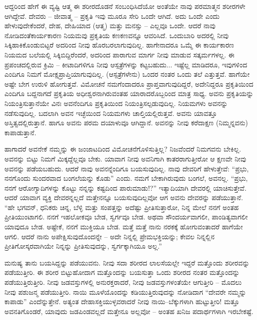 \vskip 4pt

ಆದ್ದರಿಂದ ಹೇಗೆ ಈ ವ್ಯಷ್ಟಿ ಆತ್ಮ ಈ ಶರೀರದೊಡನೆ ಸಂಬಂಧಿಸಿದೆಯೋ ಅಂತೆಯೇ ನಾವು ಪರಮಾತ್ಮನ ಶರೀರಗಳೇ ಆಗಿದ್ದೇವೆ. ದೇವರು – ಜೀವಾತ್ಮ – ಪ್ರಕೃತಿ ಇವು ಮೂರೂ ಸೇರಿ ಒಂದೇ ಆಗಿದೆ. ಅದು ಒಂದೇ ಎಂದು ಹೇಳುವುದೇಕೆಂದರೆ, ದೇಹ, ದೇಹಿಯಾದ (ಆತ್ಮ) ಮತ್ತು ಮನಸ್ಸು – ಎಲ್ಲವೂ ಒಂದೇ. ಆದರೆ ನಾವು ನೋಡಿದಂತೆ\break ಕಾರ್ಯಕಾರಣ ನಿಯಮವು ಪ್ರಕೃತಿಯ ಕಣಕಣವನ್ನೂ ಆವರಿಸಿದೆ. ಒಂದುಬಾರಿ ಅದರಲ್ಲಿ ನೀವು ಸಿಕ್ಕಿಹಾಕಿಕೊಂಡುಬಿಟ್ಟರೆ ಅದರಿಂದ ನೀವು ಹೊರಬರಲಾಗುವುದಿಲ್ಲ. ಹಾಗೇನಾದರೂ ಒಮ್ಮೆ ಈ ಕಾರ್ಯಕಾರಣ ನಿಯಮದ ಬಲೆಯಲ್ಲಿ ಸಿಕ್ಕಿಬಿದ್ದಿರೆಂದರೆ, ಅದರಿಂದ ಪಾರಾಗುವ ಮಾರ್ಗ ನೀವು ಮಾಡುವ ಸತ್ಕರ್ಮಗಳಲ್ಲ. ಈ ಪ್ರಪಂಚದಲ್ಲಿರುವ ಕ್ರಿಮಿ – ಕೀಟಾದಿಗಳಿಗೂ ನೀವು ಆಸ್ಪತ್ರೆಗಳನ್ನು ಕಟ್ಟಬಹುದು... ಇಷ್ಟೆಲ್ಲ ಮಾಡಿದರೂ, ಇವುಗಳಿಂದ ಎಂದಿಗೂ ನಿಮಗೆ ಮೋಕ್ಷಪ್ರಾಪ್ತಿಯಾಗುವುದಿಲ್ಲ. (ಆಸ್ಪತ್ರೆಗಳೇನು) ಒಂದರ ನಂತರ ಒಂದು ತಲೆ ಎತ್ತುತ್ತವೆ. ಹಾಗೆಯೇ ಅಷ್ಟೇ ಬೇಗ ಉರುಳಿ ಹೋಗುತ್ತವೆ. ವಿಮೋಚನೆ ನಮಗೆಂದಾದರೂ ಪ್ರಾಪ್ತವಾಗುವುದಿದ್ದರೆ, ಅದೇನಿದ್ದರೂ ಪ್ರಕೃತಿಯಿಂದ ಎಂದಿಗೂ ಬದ್ದನಾಗದೆ ಪ್ರಕೃತಿಯ ಅಧೀಶ್ವರನಾಗಿರುವಂತಹ ಯಾರಾದರೊಬ್ಬರಿಂದ ಮಾತ್ರ ಸಾಧ್ಯ. ಅವನು ಪ್ರಕೃತಿಯನ್ನು ನಿಯಂತ್ರಿಸುತ್ತಾನೆಯೇ ವಿನಃ ಅವನೆಂದಿಗೂ ಪ್ರಕೃತಿಯಿಂದ ನಿಯಂತ್ರಿಸಲ್ಪಡುವುದಿಲ್ಲ. ನಿಯಮಗಳು ಅವನನ್ನು ನಡೆಸುವುದಿಲ್ಲ. ಬದಲಾಗಿ ಅವನ ಇಚ್ಛೆಯಿಂದ ನಿಯಮಗಳು ಚಾಲ್ತಿಯಲ್ಲಿರುತ್ತವೆ. ಅವನು ಯಾವತ್ತೂ ಅಸ್ತಿತ್ವದಲ್ಲಿರುತ್ತಾನೆ. ಹಾಗೂ ಅವನು ಪರಮ ದಯಾಳುವೂ ಆಗಿದ್ದಾನೆ. ಅವನನ್ನು ನೀವು ಕರೆದಾಕ್ಷಣ (ನಿಮ್ಮನ್ನವನು) ಕಾಪಾಡುತ್ತಾನೆ.

\vskip 4pt

ಹಾಗಾದರೆ ಅವನೇಕೆ ನಮ್ಮನ್ನು ಈ ಜಂಜಾಟದಿಂದ ವಿಮೋಚನೆಗೊಳಿಸುತ್ತಿಲ್ಲ? ನಿಜವೆಂದರೆ ನಿಮಗವನು ಬೇಕಿಲ್ಲ. ಅವನನ್ನು ಬಿಟ್ಟು ನಿಮಗೆ ಮಿಕ್ಕದ್ದೆಲ್ಲವೂ ಬೇಕು. ಯಾವಾಗ ನೀವು ಅವನಿಗಾಗಿ ಕಾತರರಾಗುತ್ತೀರೋ ಆ ಕ್ಷಣವೇ ನೀವು ಅವನನ್ನು ಪಡೆಯಬಹುದು. ಆದರೆ ನಾವು ಅವನನ್ನೆಂದಿಗೂ ಬಯಸುವುದಿಲ್ಲ. ನಾವು ದೇವರಿಗೆ ಹೇಳುತ್ತೇವೆ: “ಪ್ರಭು, ನನಗೊಂದು ಸುಂದರವಾದ ಬಂಗಲೆಯನ್ನು ಕೊಡು” ಎಂದು. ನಮಗೆ ಬೇಕಾಗಿರುವುದು ಬಂಗಲೆ, ಅವನಲ್ಲ. “ಪ್ರಭು, ನನಗೆ ಆರೋಗ್ಯಾದಿಗಳನ್ನು ಕೊಟ್ಟು ನನ್ನನ್ನು ಕಷ್ಟದಿಂದ ಪಾರುಮಾಡು!?” ಇತ್ಯಾದಿಯಾಗಿ ದೇವರಲ್ಲಿ ಯಾಚಿಸುತ್ತೇವೆ. ಆದರೆ ಯಾವಾಗ ವ್ಯಕ್ತಿ ದೇವರನ್ನಲ್ಲದೆ ಮತ್ತೇನನ್ನೂ ಬಯಸುವುದಿಲ್ಲವೋ ಆಗ ಅವನು ದೇವರನ್ನು ಪಡೆಯುತ್ತಾನೆ. “ಹೇ ಭಗವನ್, ಧನಿಕರು ಚಿನ್ನ, ಬೆಳ್ಳಿ ಮತ್ತು ಸಂಪತ್ತನ್ನು ಅದೆಷ್ಟು ಪ್ರೀತಿಸುತ್ತಾರೋ, ನಿನ್ನ ಮೇಲೆ ನನಗೆ ಅಂತಹ ಪ್ರೀತಿಯುಂಟಾಗಲಿ. ನನಗೆ ಇಹಲೋಕವೂ ಬೇಡ, ಸ್ವರ್ಗವೂ ಬೇಡ. ಅಥವಾ ಸೌಂದರ್ಯವಾಗಲೀ, ಪಾಂಡಿತ್ಯವಾಗಲೀ ಯಾವುದೂ ಬೇಡ. ಅಷ್ಟೇಕೆ, ನನಗೆ ಮುಕ್ತಿಯೂ ಬೇಡ. ಮತ್ತೆ ಮತ್ತೆ ನಾನು ನರಕಕ್ಕೆ ಹೋಗುವಂತಾದರೆ ಹಾಗೆಯೇ ಆಗಲಿ. ಆದರೆ ನಾನು ಅಪೇಕ್ಷಿಸುವುದೊಂದನ್ನೇ – ಅದೇ ನಿನ್ನಲ್ಲಿ ಪ್ರೇಮಭಕ್ತಿಯನ್ನು; ಕೇವಲ ನಿನ್ನಲ್ಲಿನ ಪ್ರೀತಿಗೋಸ್ಕರವಾಗಿಯೇ ನಿನ್ನನ್ನು ಪ್ರೀತಿಸುವುದನ್ನು, ಸ್ವರ್ಗಕ್ಕಾಗಿಯೂ ಅಲ್ಲ.''

\vskip 4pt

ಮನುಷ್ಯ ತಾನು ಬಯಸಿದ್ದನ್ನು ಪಡೆಯುವನು. ನೀವು ಸದಾ ಶರೀರದ ಲಾಲಸೆಯಲ್ಲೇ ಇದ್ದರೆ ಮತ್ತೊಂದು ಶರೀರವನ್ನು ಪಡೆಯುತ್ತೀರಿ. ಈ ಶರೀರ ಬಿಟ್ಟುಹೋದಾಗ ಮತ್ತೊಂದನ್ನು ಬಯಸುತ್ತಾ ಒಂದು ಶರೀರದ ನಂತರ ಮತ್ತೊಂದನ್ನು ಪಡೆಯುತ್ತಿರುತ್ತೀರಿ. ನೀವು ಜಡವಸ್ತುಗಳಲ್ಲಿ ಅನುರಕ್ತರಾದರೆ, ನೀವು ಜಡವಸ್ತುಗಳಂತೆಯೇ ಆಗುತ್ತೀರಿ – ಮೊದಲು ನೀವು ಪಶುಜನ್ಮ ಪಡೆಯುತ್ತೀರಿ. ನಾಯಿ ಮೂಳೆಯೊಂದನ್ನು ಕಡಿಯುತ್ತಿರುವುದನ್ನು ನೋಡಿದಾಗ “ದೇವರೇ ನಮ್ಮನ್ನು ಕಾಪಾಡು'' ಎಂದೆನ್ನುತ್ತೇನೆ. ಅತ್ಯಂತ ದೇಹಾಸಕ್ತಿಯುಳ್ಳವರಾದರೆ ನೀವು ನಾಯಿ–ಬೆಕ್ಕುಗಳಾಗಿ ಹುಟ್ಟುತ್ತೀರಿ! ಮತ್ತೂ ಅವನತಿಗೊಂಡರೆ, ಯಾವುದು ಜಡಪಿಂಡವಲ್ಲದೆ ಮತ್ತೇನೂ ಅಲ್ಲವೋ – ಅಂತಹ ಖನಿಜ ಪದಾರ್ಥಗಳಾಗಿ ಇರಬೇಕಷ್ಟೆ.

